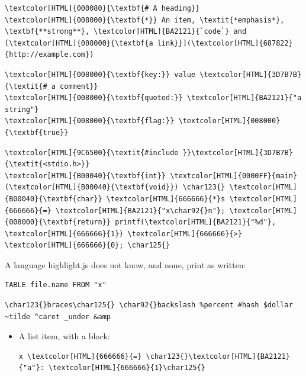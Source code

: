 \begin{Verbatim}[commandchars=\\\{\}]
\textcolor[HTML]{000080}{\textbf{# A heading}}
\textcolor[HTML]{008000}{\textbf{*}} An item, \textit{*emphasis*}, \textbf{**strong**}, \textcolor[HTML]{BA2121}{`code`} and [\textcolor[HTML]{008000}{\textbf{a link}}](\textcolor[HTML]{687822}{http://example.com})
\end{Verbatim}

\begin{Verbatim}[commandchars=\\\{\}]
\textcolor[HTML]{008000}{\textbf{key:}} value \textcolor[HTML]{3D7B7B}{\textit{# a comment}}
\textcolor[HTML]{008000}{\textbf{quoted:}} \textcolor[HTML]{BA2121}{"a string"}
\textcolor[HTML]{008000}{\textbf{flag:}} \textcolor[HTML]{008000}{\textbf{true}}
\end{Verbatim}

\begin{Verbatim}[commandchars=\\\{\}]
\textcolor[HTML]{9C6500}{\textit{#include }}\textcolor[HTML]{3D7B7B}{\textit{<stdio.h>}}
\textcolor[HTML]{B00040}{\textbf{int}} \textcolor[HTML]{0000FF}{main}(\textcolor[HTML]{B00040}{\textbf{void}}) \char123{} \textcolor[HTML]{B00040}{\textbf{char}} \textcolor[HTML]{666666}{*}s \textcolor[HTML]{666666}{=} \textcolor[HTML]{BA2121}{"x\char92{}n"}; \textcolor[HTML]{008000}{\textbf{return}} printf(\textcolor[HTML]{BA2121}{"%d"}, \textcolor[HTML]{666666}{1}) \textcolor[HTML]{666666}{>} \textcolor[HTML]{666666}{0}; \char125{}
\end{Verbatim}

A language highlight.js does not know, and none, print as written:

\begin{Verbatim}[commandchars=\\\{\}]
TABLE file.name FROM "x"
\end{Verbatim}

\begin{Verbatim}[commandchars=\\\{\}]
\char123{}braces\char125{} \char92{}backslash %percent #hash $dollar ~tilde ^caret _under &amp
\end{Verbatim}

\begin{itemize}
\item A list item, with a block:

\begin{Verbatim}[commandchars=\\\{\}]
x \textcolor[HTML]{666666}{=} \char123{}\textcolor[HTML]{BA2121}{"a"}: \textcolor[HTML]{666666}{1}\char125{}
\end{Verbatim}
\end{itemize}

